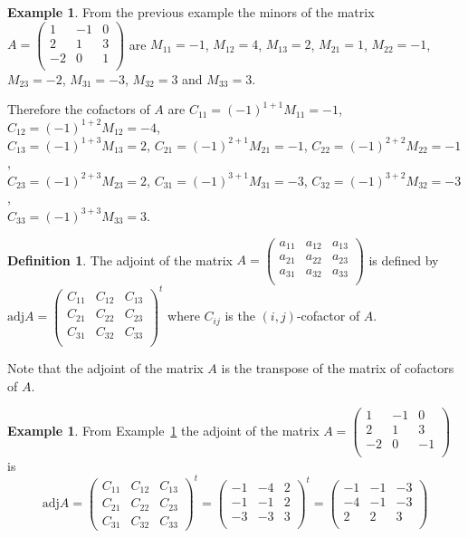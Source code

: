 \documentclass[11pt,a4paper]{article}
\theoremstyle{definition}
\newtheorem{defn}[thm]{Definition}
\newtheorem{exa}[thm]{Example}
\begin{document}
\begin{exa}\label{exa:minors}
From the previous example the minors of the matrix $A=
\begin{pmatrix}
1&-1&0\\2&1&3\\-2&0&1\\
\end{pmatrix}
$ are $M_{11}=-1$, $M_{12}=4$, $M_{13}=2$, $M_{21}=1$, $M_{22}=-1$, $M_{23}=-2$, $M_{31}=-3$, $M_{32}=3$ and $M_{33}=3$.

Therefore the cofactors of $A$ are $C_{11}=(-1)^{1+1}M_{11}=-1$, $C_{12}=(-1)^{1+2}M_{12}=-4$,\\ $C_{13}=(-1)^{1+3}M_{13}=2$, $C_{21}=(-1)^{2+1}M_{21}=-1$, $C_{22}=(-1)^{2+2}M_{22}=-1$,\\ $C_{23}=(-1)^{2+3}M_{23}=2$, $C_{31}=(-1)^{3+1}M_{31}=-3$, $C_{32}=(-1)^{3+2}M_{32}=-3$,\\ $C_{33}=(-1)^{3+3}M_{33}=3$.
\end{exa}


\begin{defn}
The adjoint of the matrix $A=
\begin{pmatrix}
a_{11}&a_{12}&a_{13}\\a_{21}&a_{22}&a_{23}\\a_{31}&a_{32}&a_{33}\\
\end{pmatrix}
$ is defined by $\text{adj}A=
\begin{pmatrix}
C_{11}&C_{12}&C_{13}\\C_{21}&C_{22}&C_{23}\\C_{31}&C_{32}&C_{33}\\
\end{pmatrix}^t
$ where $C_{ij}$ is the $(i,j)$-cofactor of $A$.

Note that the adjoint of the matrix $A$ is the transpose of the matrix of cofactors of $A$.
\end{defn}


\begin{exa}\label{exa:adjoint}
From Example~\ref{exa:minors} the adjoint of the matrix $A=
\begin{pmatrix}
1&-1&0\\2&1&3\\-2&0&-1\\
\end{pmatrix}
$ is $$\text{adj} A=
\begin{pmatrix}
C_{11}&C_{12}&C_{13}\\C_{21}&C_{22}&C_{23}\\C_{31}&C_{32}&C_{33}
\end{pmatrix}^t=
\begin{pmatrix}
-1&-4&2\\-1&-1&2\\-3&-3&3\\
\end{pmatrix}^t
=
\begin{pmatrix}
-1&-1&-3\\-4&-1&-3\\2&2&3\\
\end{pmatrix}
$$
\end{exa}
\end{document}
